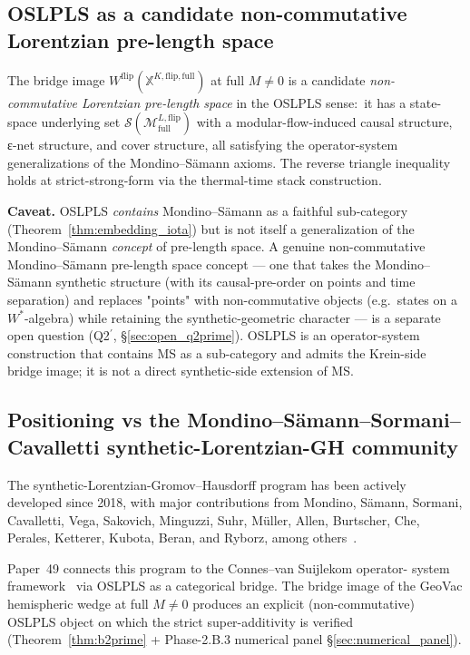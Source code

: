 \documentclass[11pt,a4paper]{article}
\theoremstyle{plain}
\theoremstyle{definition}
\newcommand{\Scal}{\mathcal{S}}
\newcommand{\Mcal}{\mathcal{M}}
\newcommand{\Mflipfull}{\Mcal^{L,\mathrm{flip}}_{\mathrm{full}}}
\newcommand{\Wflip}{W^{\mathrm{flip}}}
\newcommand{\osXkrein}{\mathbb{X}^{K,\mathrm{flip},\mathrm{full}}}
\begin{document}
\subsection{OSLPLS as a candidate non-commutative Lorentzian
pre-length space}\label{sec:oslpls_as_nclpls}

The bridge image $\Wflip(\osXkrein)$ at full $M\ne 0$ is a candidate
\emph{non-commutative Lorentzian pre-length space} in the OSLPLS
sense:\ it has a state-space underlying set $\Scal(\Mflipfull)$
with a modular-flow-induced causal structure, ε-net structure, and
cover structure, all satisfying the operator-system generalizations
of the Mondino--S\"amann axioms. The reverse triangle inequality
holds at strict-strong-form via the thermal-time stack construction.

\textbf{Caveat.} OSLPLS \emph{contains} Mondino--S\"amann as a
faithful sub-category (Theorem~\ref{thm:embedding_iota}) but is not
itself a generalization of the Mondino--S\"amann \emph{concept} of
pre-length space. A genuine non-commutative Mondino--S\"amann
pre-length space concept --- one that takes the Mondino--S\"amann
synthetic structure (with its causal-pre-order on points and time
separation) and replaces "points" with non-commutative objects (e.g.\
states on a $W^{*}$-algebra) while retaining the synthetic-geometric
character --- is a separate open question (Q2$^{\prime}$,
\S\ref{sec:open_q2prime}). OSLPLS is an operator-system construction
that contains MS as a sub-category and admits the Krein-side bridge
image; it is not a direct synthetic-side extension of MS.

\subsection{Positioning vs the Mondino--S\"amann--Sormani--Cavalletti
synthetic-Lorentzian-GH community}\label{sec:ms_community}

The synthetic-Lorentzian-Gromov--Hausdorff program has been actively
developed since 2018, with major contributions from Mondino, S\"amann,
Sormani, Cavalletti, Vega, Sakovich, Minguzzi, Suhr, M\"uller, Allen,
Burtscher, Che, Perales, Ketterer, Kubota, Beran, and Ryborz, among
others~\cite{kunzinger_samann2018, mondino_samann2025_pointed,
mondino_ryborz_samann2025, sormani_vega2016, sakovich_sormani2024,
minguzzi_suhr2024, muller2022, allen_burtscher2022,
che_perales_sormani2025, ketterer2026, kubota2026}.

Paper~49 connects this program to the Connes--van Suijlekom operator-
system framework~\cite{connes_vs2021} via OSLPLS as a categorical
bridge. The bridge image of the GeoVac hemispheric wedge at full
$M\ne 0$ produces an explicit (non-commutative) OSLPLS object on
which the strict super-additivity is verified
(Theorem~\ref{thm:b2prime} + Phase-2.B.3 numerical panel
\S\ref{sec:numerical_panel}).
\end{document}
